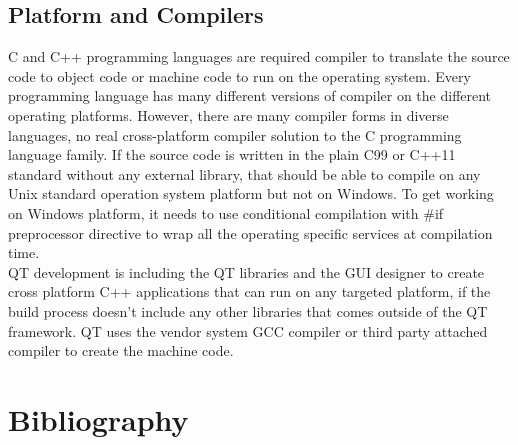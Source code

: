 \documentclass[12pt]{article}
\begin{document}
\subsection{Platform and Compilers}
C and C++ programming languages are required compiler to translate the source code to object code or machine code to run on the operating system. Every programming language has many different versions of compiler on the different operating platforms. However, there are many compiler forms in  diverse languages, no real cross-platform compiler solution to the C programming language family. If the source code is written in the plain C99 or C++11 standard without any external library, that should be able to compile on any Unix standard operation system platform but not on Windows. To get working on Windows platform, it needs to use conditional compilation with \#if preprocessor directive to wrap all the operating specific services at compilation time.\\ 

QT development is including the QT libraries and the GUI designer to create cross platform C++ applications that can run on any targeted platform, if the build process doesn't include any other libraries that comes outside of the QT framework. QT uses the vendor system GCC compiler or third party attached compiler to create the machine code.

\newpage
\section{Bibliography}
\begin{center}


\end{center}
\end{document}
